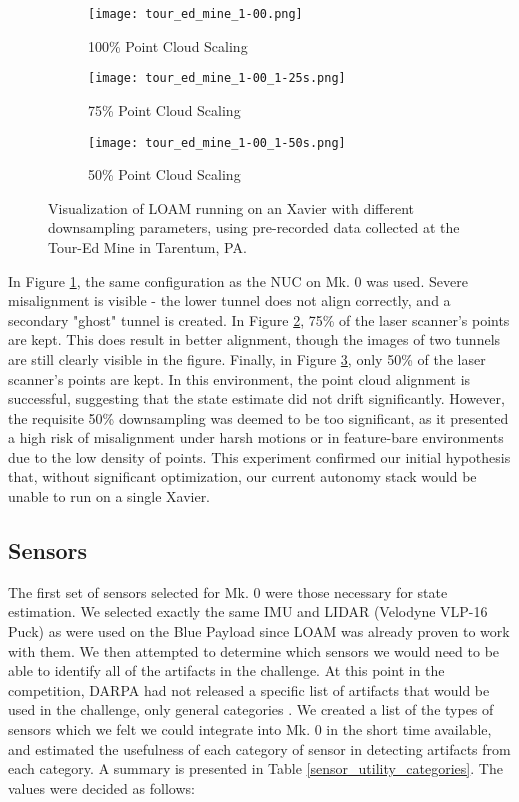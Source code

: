 \begin{figure}
	\centering
	\begin{subfigure}{0.3\textwidth}
		\texttt{[image: tour\_ed\_mine\_1-00.png]}
		\caption{100\% Point Cloud Scaling}
		\label{loam_xavier_100}
	\end{subfigure}		
	\hfill
	\begin{subfigure}{0.3\textwidth}
		\texttt{[image: tour\_ed\_mine\_1-00\_1-25s.png]}
		\caption{75\% Point Cloud Scaling}
		\label{loam_xavier_75}		
	\end{subfigure}
	\hfill
	\begin{subfigure}{0.3\textwidth}
		\texttt{[image: tour\_ed\_mine\_1-00\_1-50s.png]}
		\caption{50\% Point Cloud Scaling}
		\label{loam_xavier_50}
	\end{subfigure}	
	\caption[Visualization of LOAM running on an Xavier]{Visualization of LOAM running on an Xavier with different downsampling parameters, using pre-recorded data collected at the Tour-Ed Mine in Tarentum, PA.}
	\label{loam_xavier}
\end{figure}

In Figure \ref{loam_xavier_100}, the same configuration as the NUC on Mk. 0 was used. Severe misalignment is visible - the lower tunnel does not align correctly, and a secondary "ghost" tunnel is created. In Figure \ref{loam_xavier_75}, 75\% of the laser scanner's points are kept. This does result in better alignment, though the images of two tunnels are still clearly visible in the figure. Finally, in Figure \ref{loam_xavier_50}, only 50\% of the laser scanner's points are kept. In this environment, the point cloud alignment is successful, suggesting that the state estimate did not drift significantly. However, the requisite 50\% downsampling was deemed to be too significant, as it presented a high risk of misalignment under harsh motions or in feature-bare environments due to the low density of points. This experiment confirmed our initial hypothesis that, without significant optimization, our current autonomy stack would be unable to run on a single Xavier.

\subsection{Sensors}

The first set of sensors selected for Mk. 0 were those necessary for state estimation. We selected exactly the same IMU and LIDAR (Velodyne VLP-16 Puck) as were used on the Blue Payload since LOAM was already proven to work with them. We then attempted to determine which sensors we would need to be able to identify all of the artifacts in the challenge. At this point in the competition, DARPA had not released a specific list of artifacts that would be used in the challenge, only general categories \cite{tunnel_rules}. We created a list of the types of sensors which we felt we could integrate into Mk. 0 in the short time available, and estimated the usefulness of each category of sensor in detecting artifacts from each category. A summary is presented in Table \ref{sensor_utility_categories}. The values were decided as follows:

